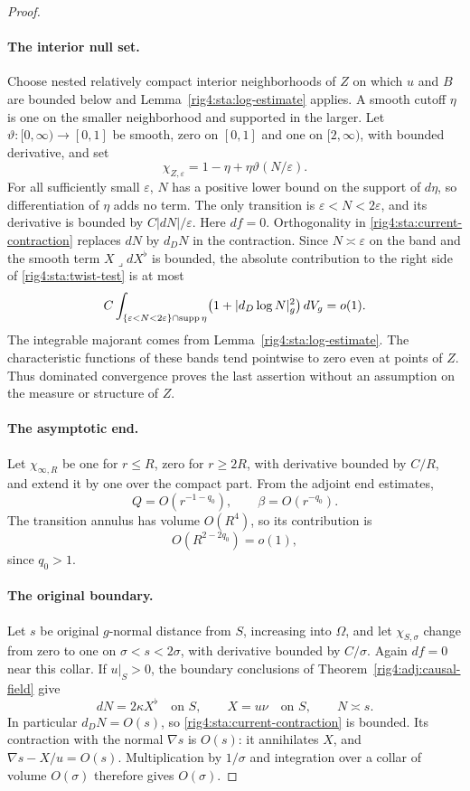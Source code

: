\begin{proof}
\paragraph{The interior null set.}
Choose nested relatively compact interior neighborhoods of $Z$ on
which $u$ and $B$ are bounded below and
Lemma~\ref{rig4:sta:log-estimate} applies. A smooth cutoff $\eta$ is one on
the smaller neighborhood and supported in the larger. Let
$\vartheta:[0,\infty)\to[0,1]$ be smooth, zero on $[0,1]$ and one on
$[2,\infty)$, with bounded derivative, and set
\[
 \chi_{Z,\varepsilon}=1-\eta+\eta\vartheta(N/\varepsilon).
\]
For all sufficiently small $\varepsilon$, $N$ has a positive lower
bound on the support of $d\eta$, so differentiation of $\eta$ adds
no term. The only transition is $\varepsilon<N<2\varepsilon$, and
its derivative is bounded by $C|dN|/\varepsilon$.
Here $df=0$. Orthogonality in
\eqref{rig4:sta:current-contraction} replaces $dN$ by $d_DN$ in the
contraction. Since $N\asymp\varepsilon$ on the band and the smooth
term $X\mathbin{\lrcorner}dX^\flat$ is bounded, the absolute
contribution to the right side of \eqref{rig4:sta:twist-test} is at most
\begin{equation}\label{rig4:sta:null-cutoff-cost}
 C\int_{\{\varepsilon<N<2\varepsilon\}\cap\operatorname{supp}\eta}
       \bigl(1+|d_D\log N|_g^2\bigr)\,dV_g=o(1).
\end{equation}
The integrable majorant comes from
Lemma~\ref{rig4:sta:log-estimate}. The characteristic functions of these
bands tend pointwise to zero even at points of $Z$. Thus dominated
convergence proves the last assertion without an assumption on the
measure or structure of $Z$.

\paragraph{The asymptotic end.}
Let $\chi_{\infty,R}$ be one for $r\le R$, zero for $r\ge2R$,
with derivative bounded by $C/R$, and extend it by one over the
compact part. From the adjoint end estimates,
\[
 Q=O(r^{-1-q_0}),\qquad \beta=O(r^{-q_0}).
\]
The transition annulus has volume $O(R^4)$, so its contribution is
\begin{equation}\label{rig4:sta:end-cutoff-cost}
 O(R^{2-2q_0})=o(1),
\end{equation}
since $q_0>1$.

\paragraph{The original boundary.}
Let $s$ be original $g$-normal distance from $S$, increasing into
$\Omega$, and let $\chi_{S,\sigma}$ change from zero to one on
$\sigma<s<2\sigma$, with derivative bounded by $C/\sigma$.
Again $df=0$ near this collar. If $u|_S>0$, the boundary conclusions
of Theorem~\ref{rig4:adj:causal-field} give
\[
 dN=2\kappa X^\flat\quad\text{on }S,
 \qquad X=u\nu\quad\text{on }S,
 \qquad N\asymp s.
\]
In particular $d_DN=O(s)$, so
\eqref{rig4:sta:current-contraction} is bounded. Its contraction with the
normal $\nabla s$ is $O(s)$: it annihilates $X$, and
$\nabla s-X/u=O(s)$. Multiplication by $1/\sigma$ and integration
over a collar of volume $O(\sigma)$ therefore gives $O(\sigma)$.


\end{proof}

